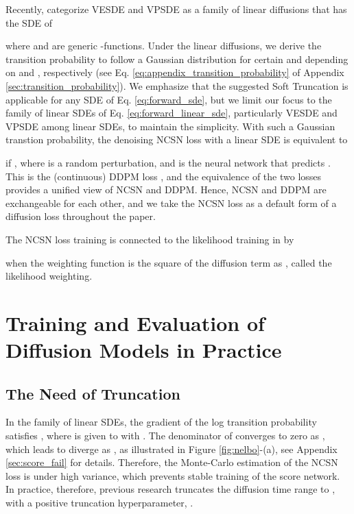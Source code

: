 \documentclass[nohyperref]{article}
\theoremstyle{plain}
\theoremstyle{definition}
\theoremstyle{remark}
\begin{document}
Recently, \citet{kim2022maximum} categorize VESDE and VPSDE as a family of linear diffusions that has the SDE of

where  and  are generic -functions. Under the linear diffusions, we derive the transition probability to follow a Gaussian distribution  for certain  and  depending on  and , respectively (see Eq. \eqref{eq:appendix_transition_probability} of Appendix \ref{sec:transition_probability}). We emphasize that the suggested Soft Truncation is applicable for any SDE of Eq. \eqref{eq:forward_sde}, but we limit our focus to the family of linear SDEs of Eq. \eqref{eq:forward_linear_sde}, particularly VESDE and VPSDE among linear SDEs, to maintain the simplicity. With such a Gaussian transtion probability, the denoising NCSN loss with a linear SDE is equivalent to

if , where  is a random perturbation, and  is the neural network that predicts . This is the (continuous) DDPM loss \cite{song2020score}, and the equivalence of the two losses provides a unified view of NCSN and DDPM. Hence, NCSN and DDPM are exchangeable for each other, and we take the NCSN loss as a default form of a diffusion loss throughout the paper.

The NCSN loss training is connected to the likelihood training in \citet{song2021maximum} by

when the weighting function is the square of the diffusion term as , called the likelihood weighting. 

\section{Training and Evaluation of Diffusion Models in Practice}\label{sec:practice}

\subsection{The Need of Truncation}\label{sec:diverging}

In the family of linear SDEs, the gradient of the log transition probability satisfies , where  is given to  with . The denominator of  converges to zero as , which leads  to diverge as , as illustrated in Figure \ref{fig:nelbo}-(a), see Appendix \ref{sec:score_fail} for details. Therefore, the Monte-Carlo estimation of the NCSN loss is under high variance, which prevents stable training of the score network. In practice, therefore, previous research truncates the diffusion time range to , with a positive truncation hyperparameter, .
\end{document}
